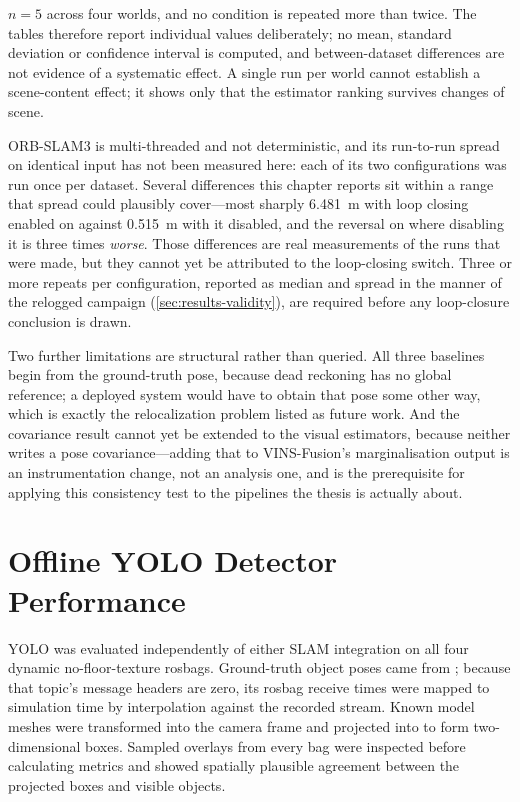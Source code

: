 \begin{queried}
$n=5$ across four worlds, and no condition is repeated more than twice. The tables
therefore report individual values deliberately; no mean, standard deviation or
confidence interval is computed, and between-dataset differences are not evidence
of a systematic effect. A single run per world cannot establish a scene-content
effect; it shows only that the estimator ranking survives changes of scene.
\end{queried}

\begin{queried}
ORB-SLAM3 is multi-threaded and not deterministic, and its run-to-run spread on
identical input has not been measured here: each of its two configurations was run
once per dataset. Several differences this chapter reports sit within a range that
spread could plausibly cover---most sharply \SI{6.481}{\metre} with loop closing
enabled on  against \SI{0.515}{\metre} with it disabled, and
the reversal on  where disabling it is three times
\emph{worse}. Those differences are real measurements of the runs that were made,
but they cannot yet be attributed to the loop-closing switch. Three or more
repeats per configuration, reported as median and spread in the manner of the
relogged campaign (\cref{sec:results-validity}), are required before any
loop-closure conclusion is drawn.
\end{queried}

Two further limitations are structural rather than queried. All three baselines
begin from the ground-truth pose, because dead reckoning has no global reference;
a deployed system would have to obtain that pose some other way, which is exactly
the relocalization problem listed as future work. And the covariance result cannot
yet be extended to the visual estimators, because neither writes a pose
covariance---adding that to VINS-Fusion's marginalisation output is an
instrumentation change, not an analysis one, and is the prerequisite for applying
this consistency test to the pipelines the thesis is actually about.

\section{Offline YOLO Detector Performance}
\label{sec:yolo-performance}

YOLO was evaluated independently of either SLAM integration on all four dynamic
no-floor-texture rosbags. Ground-truth object poses came from
; because that topic's message headers are zero,
its rosbag receive times were mapped to simulation time by interpolation against
the recorded  stream. Known model meshes were transformed into the
camera frame and projected into  to form two-dimensional boxes.
Sampled overlays from every bag were inspected before calculating metrics and
showed spatially plausible agreement between the projected boxes and visible
objects.

